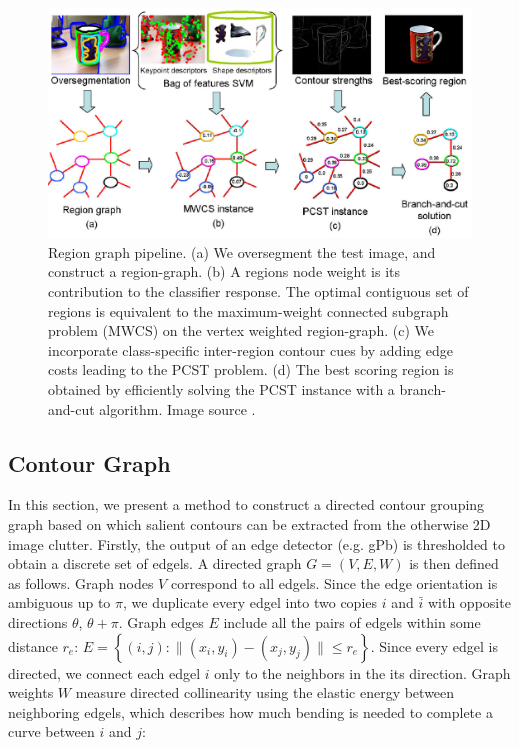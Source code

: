 \documentclass{SMBV12}
\begin{document}
\begin{figure}[htbp]
    \centering
    \includegraphics[width=\textwidth]{images/region_graph1.png}
    \caption{Region graph pipeline. (a) We oversegment the test image, and construct a region-graph. (b) A region\textquotesingle s node weight is its contribution to the classifier response. The optimal contiguous set of regions is equivalent to the maximum-weight connected subgraph problem (MWCS) on the vertex weighted region-graph. (c) We incorporate class-specific inter-region contour cues by adding edge costs leading to the PCST problem. (d) The best scoring region is obtained by efficiently solving the PCST instance with a branch-and-cut algorithm. Image source \cite{VijayGrauman2011}.}
    \label{fig:region_graph}
\end{figure}

\subsection{Contour Graph}

In this section, we present a method to construct a directed contour grouping graph \cite{zhu2007untangling} based on which salient contours can be extracted from the otherwise 2D image clutter. Firstly, the output of an edge detector (e.g. gPb) is thresholded to obtain a discrete set of edgels. A directed graph $G = (V,E,W)$ is then defined as follows. Graph nodes $V$ correspond to all edgels. Since the edge orientation is ambiguous up to $\pi$, we duplicate every edgel into two copies $i$ and $\bar{i}$ with opposite directions $\theta$, $\theta + \pi$. Graph edges $E$ include all the pairs of edgels within some distance $r_e$: $E = \left\lbrace (i, j): \| (x_i, y_i) - (x_j, y_j) \| \leq r_e \right\rbrace$. Since every edgel is directed, we connect each edgel $i$ only to the neighbors in the its direction. Graph weights $W$ measure directed collinearity using the elastic energy between neighboring edgels, which describes how much bending is needed to complete a curve between $i$ and $j$:
\end{document}
